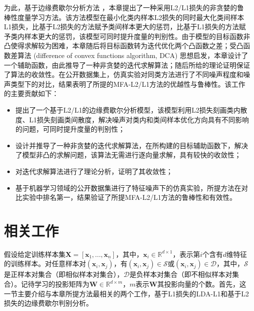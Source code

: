 为此，基于边缘费歇尔分析方法 \citep{ShuichengYan2007,Xiong2014}，本章提出了一种采用L2/L1损失的非贪婪的鲁棒性度量学习方法。该方法模型在最小化类内样本L2损失的同时最大化类间样本L1损失，比基于L2损失的方法赋予类间样本更大的惩罚，比基于L1损失的方法赋予类内样本更大的惩罚，该模型可同时提升度量的判别性。由于模型的目标函数非凸使得求解较为困难，本章随后将目标函数转为迭代优化两个凸函数之差；受凸函数差算法 (difference of convex functions algorithm, DCA) \citep{tao2005dc}思想启发，本章设计了一个辅助函数，由此推导了一种非贪婪的迭代求解算法；随后所给的理论证明保证了算法的收敛性。在公开数据集上，仿真实验对同类方法进行了不同噪声程度和噪声类型下的对比，结果表明了所提的MFA-L2/L1方法的优越性与鲁棒性。该工作的主要贡献如下：
\begin{itemize}
    \item 提出了一个基于L2/L1的边缘费歇尔分析模型，该模型利用L2损失刻画类内散度、L1损失刻画类间散度，解决噪声对类内和类间样本优化方向具有不同影响的问题，可同时提升度量的判别性；
    \item 设计并推导了一种非贪婪的迭代求解算法，在所构建的目标辅助函数下，解决了模型非凸的求解问题，该算法无需进行逐向量求解，具有较快的收敛性；
    \item 对迭代求解算法进行了理论分析，证明了其收敛性；
    \item 基于机器学习领域的公开数据集进行了特征噪声下的仿真实验，所提方法在对比实验中排名第一，结果验证了所提MFA-L2/L1方法的鲁棒性和有效性。
\end{itemize}

\section{相关工作}
假设给定训练样本集$\boldsymbol{X}=[\boldsymbol{x}_1,...,\boldsymbol{x}_n]$，其中，$\boldsymbol{x}_i\in \mathbb{R}^{d \times 1}$，表示第$i$个含有$d$维特征的训练样本。对任意样本对$(\boldsymbol{x}_i,\boldsymbol{x}_j)$，有$(\boldsymbol{x}_i,\boldsymbol{x}_j)\in \mathcal{S}$或$(\boldsymbol{x}_i,\boldsymbol{x}_j)\in \mathcal{D}$，其中，$\mathcal{S}$是正样本对集合（即相似样本对集合），$\mathcal{D}$是负样本对集合（即不相似样本对集合）。记待学习的投影矩阵为$\boldsymbol{W} \in \mathbb{R}^{d \times m}$，$m$表示$\boldsymbol{W}$其投影向量的个数。首先，这一节主要介绍与本章所提方法最相关的两个工作，基于L1损失的LDA-L1和基于L2损失的边缘费歇尔判别分析。

